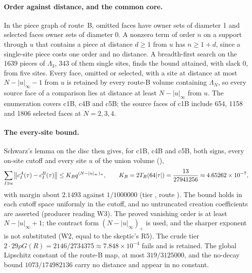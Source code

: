 \paragraph{Order against distance, and the common core.} In the piece graph
of route~B, omitted faces have owner sets of diameter 1 and selected faces
owner sets of diameter 0. A nonzero term of order $n$ on a support through
$u$ that contains a piece at distance $d\ge1$ from $u$ has $n\ge1+d$, since a
single-site piece costs one order and no distance. A breadth-first search on
the 1639 pieces of $\Lambda_3$, 343 of them single sites, finds the bound
attained, with slack 0, from five sites. Every face, omitted or selected,
with a site at distance at most $N-|u|_\infty-1$ from $u$ is retained by
every route-B volume containing $\Lambda_N$, so every source face of a
comparison lies at distance at least $N-|u|_\infty$ from $u$. The enumeration
covers c1B, c4B and c5B; the source faces of c1B include 654, 1158 and 1806
selected faces at $N=2,3,4$.

\paragraph{The every-site bound.} Schwarz's lemma on the disc then gives, for
c1B, c4B and c5B, both signs, every on-site cutoff and every site $u$ of the
union volume (),
\begin{equation}
 \sum_{I\ni u}\left\lVert c^A_I(\tau)-c^B_I(\tau)\right\rVert\le K_Bq^{(N-|u|_\infty)_+},\qquad
 K_B=2T_B(64|\tau|)=\frac{13}{27941256}\approx4.65262\times10^{-7},
 \label{eq:bc2-KB}
\end{equation}
with margin about $2.1493$ against $1/1000000$ (tier
, route ). The bound holds in
each cutoff space uniformly in the cutoff, and no untruncated creation
coefficients are asserted (producer reading W3). The proved vanishing order is
at least $N-|u|_\infty+1$; the contract form $(N-|u|_\infty)_+$ is used, and
the sharper exponent is not substituted (W2, equal to the skeptic's R5). The
crude tier $2\cdot29\rho G(R)=2146/2734375\approx7.848\times10^{-4}$ fails and
is retained. The global Lipschitz constant of the route-B map, at most
$319/3125000$, and the no-decay bound $1073/174982136$ carry no distance and
appear in no constant.

